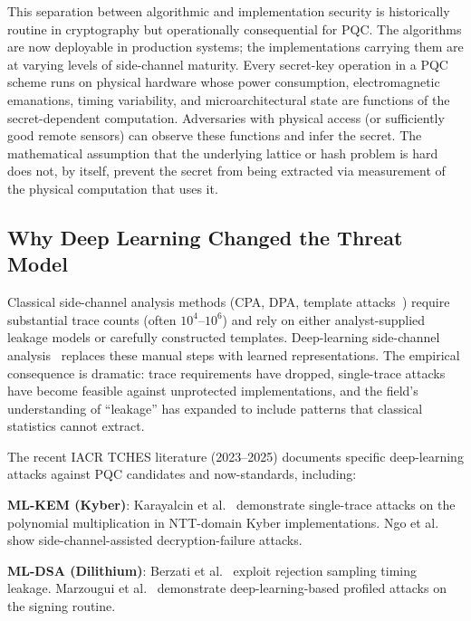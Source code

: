 \documentclass[sigconf,nonacm]{acmart}
\begin{document}
This separation between algorithmic and implementation security is
historically routine in cryptography but operationally consequential for
PQC. The algorithms are now deployable in production systems; the
implementations carrying them are at varying levels of side-channel
maturity. Every secret-key operation in a PQC scheme runs on physical
hardware whose power consumption, electromagnetic emanations, timing
variability, and microarchitectural state are functions of the
secret-dependent computation. Adversaries with physical access (or
sufficiently good remote sensors) can observe these functions and infer
the secret. The mathematical assumption that the underlying lattice or
hash problem is hard does not, by itself, prevent the secret from being
extracted via measurement of the physical computation that uses it.

\subsection{Why Deep Learning Changed the Threat Model}

Classical side-channel analysis methods (CPA, DPA, template
attacks~\cite{kocher1999dpa,brier2004cpa,chari2002template}) require
substantial trace counts (often $10^4$--$10^6$) and rely on either
analyst-supplied leakage models or carefully constructed templates.
Deep-learning side-channel analysis~\cite{maghrebi2016breaking,
benadjila2020study,perin2024sca} replaces these manual steps with
learned representations. The empirical consequence is dramatic: trace
requirements have dropped, single-trace attacks have become feasible
against unprotected implementations, and the field's understanding of
``leakage'' has expanded to include patterns that classical statistics
cannot extract.

The recent IACR TCHES literature (2023--2025) documents specific
deep-learning attacks against PQC candidates and now-standards,
including:

\textbf{ML-KEM (Kyber)}: Karayalcin et al.~\cite{karayalcin2024kyber}
demonstrate single-trace attacks on the polynomial multiplication
in NTT-domain Kyber implementations. Ngo et al.~\cite{ngo2024decryption}
show side-channel-assisted decryption-failure attacks.

\textbf{ML-DSA (Dilithium)}: Berzati et al.~\cite{berzati2023dilithium}
exploit rejection sampling timing leakage. Marzougui et
al.~\cite{marzougui2025dilithium} demonstrate deep-learning-based
profiled attacks on the signing routine.
\end{document}
